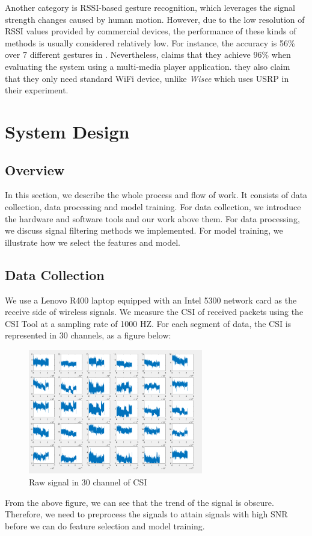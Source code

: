 \documentclass[conference]{IEEEtran}
\begin{document}
Another category is RSSI-based gesture recognition, which leverages the signal strength changes caused by human motion.
However, due to the low resolution of RSSI values provided by commercial devices, the performance of these kinds of methods is usually considered relatively low.
For instance, the accuracy is 56\% over 7 different gestures in \cite{sigg2014telepathic}.
Nevertheless, \cite{abdelnasser2015wigest} claims that they achieve 96\% when evaluating the system using a multi-media player application.
they also claim that they only need standard WiFi device, unlike \emph{Wisee} which uses USRP in their experiment.


\section{System Design} \label{section-design}
\subsection{Overview}
In this section, we describe the whole process and flow of work. It consists of data collection, data processing and model training. For data collection, we introduce the hardware and software tools and our work above them. For data processing, we discuss signal filtering methods we implemented. For model training, we illustrate how we select the features and model.
\subsection{Data Collection}
We use a Lenovo R400 laptop equipped with an Intel 5300 network card as the receive side of wireless signals. We measure the CSI of received packets using the CSI Tool at a sampling rate of 1000 HZ. For each segment of data, the CSI is represented in 30 channels, as a figure below:
\begin{figure}[H]
\includegraphics[width=3in]{Original.png}
\caption{Raw signal in 30 channel of CSI}
\end{figure}
From the above figure, we can see that the trend of the signal is obscure. Therefore, we need to preprocess the signals to attain signals with high SNR before we can do feature selection and model training.
\end{document}
